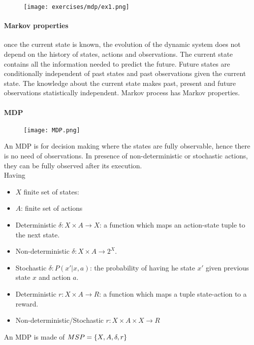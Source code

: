 \begin{figure}[H]
    \centering
     \texttt{[image: exercises/mdp/ex1.png]}
\end{figure}

\paragraph{Markov properties} once the current state is known, the evolution of the dynamic system does not depend on the history of states, actions and observations. The current state contains all the information needed to predict the future. Future states are conditionally independent of past states and past observations given the current state. The knowledge about the current state makes past, present and future observations statistically independent. Markov process has Markov properties.\\


\paragraph{MDP}
\begin{figure}[H]
    \centering
    \texttt{[image: MDP.png]}
\end{figure}

An MDP is for decision making where the states are fully observable, hence there is  no need of observations. In presence of non-deterministic or stochastic actions, they can be fully observed after its execution.\\
Having 
\begin{itemize}
\item $X$ finite set of states:
\item $A$: finite set of actions
\item Deterministic $\delta: X\times A \rightarrow X$: a function which maps an action-state tuple to the next state.
\item Non-deterministic $\delta: X\times A \rightarrow 2^X$.
\item Stochastic $\delta: P(x'|x,a)$: the probability of having he state $x'$ given previous state $x$ and action $a$.
\item Deterministic $r:X\times A \rightarrow R$: a function which maps a tuple state-action to a reward.
\item Non-deterministic/Stochastic $r:X\times A \times X \rightarrow R$
\end{itemize}
An MDP is made of $MSP=\lbrace{X,A,\delta,r}\rbrace$

